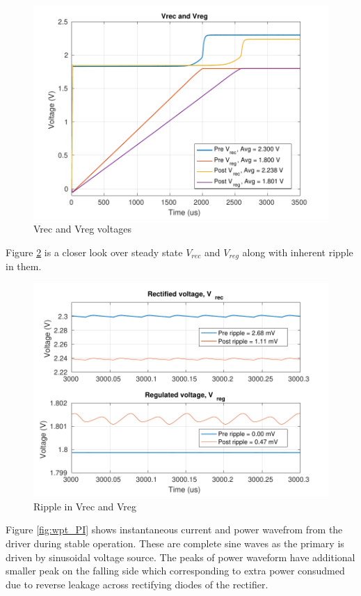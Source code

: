 \documentclass[12pt,a4paper,UKenglish]{article}
\begin{document}
\begin{figure} [H]
  \centering
  \includegraphics[width=\textwidth]{img/wpt_V_both.pdf} 
 \caption{Vrec and Vreg voltages} 
\label{fig:wpt_vout} 
\end{figure}

Figure \ref{fig:wpt_ripple} is a closer look over steady state $V_{rec}$ and $V_{reg}$ along with inherent ripple in them. \\

\begin{figure} [H]
  \centering
  \includegraphics[width=\textwidth]{img/wpt_ripple_both.pdf} 
 \caption{Ripple in Vrec and Vreg} 
\label{fig:wpt_ripple} 
\end{figure}

Figure \ref{fig:wpt_PI} shows instantaneous current and power wavefrom from the driver during stable operation. These are complete sine waves as the primary is driven by sinusoidal voltage source. The peaks of power waveform have additional smaller peak on the falling side which corresponding to extra power consudmed due to reverse leakage across rectifying diodes of the rectifier. \\
\end{document}
